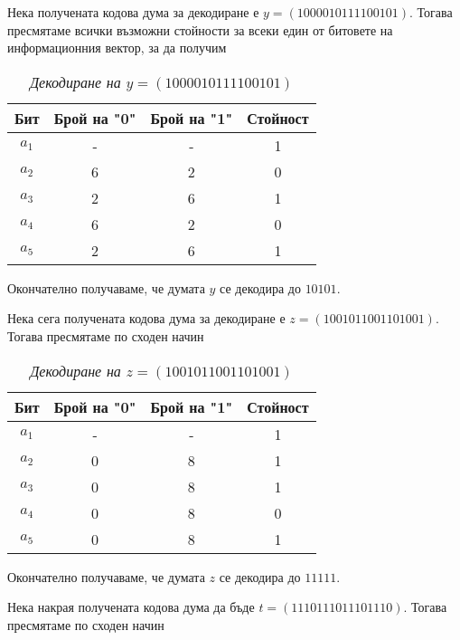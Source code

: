 \documentclass[11pt, oneside]{article}   	%
\begin{document}
Нека получената кодова дума за декодиране е $y = (1000 0101 1110 0101)$. Тогава пресмятаме всички възможни стойности за всеки един от битовете на информационния вектор, за да получим

\begin{table}[htbp]
    \centering
    \begin{tabular}{cccc}
        \toprule
            \textbf{Бит} & \textbf{Брой на "0"} & \textbf{Брой на "1"} & \textbf{Стойност} \\
        \midrule
            $ a_1 $ & - & - & 1 \\
            $ a_2 $ & 6 & 2 & 0 \\
            $ a_3 $ & 2 & 6 & 1 \\
            $ a_4 $ & 6 & 2 & 0 \\
            $ a_5 $ & 2 & 6 & 1 \\
        \bottomrule
    \end{tabular}
    \caption{\textit{Декодиране на $y = (1000 0101 1110 0101)$}}
\end{table}

Окончателно получаваме, че думата $y$ се декодира до $10101$.

Нека сега получената кодова дума за декодиране е $z = (1001 0110 0110 1001)$. Тогава пресмятаме по сходен начин

\begin{table}[htbp]
    \centering
    \begin{tabular}{cccc}
        \toprule
            \textbf{Бит} & \textbf{Брой на "0"} & \textbf{Брой на "1"} & \textbf{Стойност} \\
        \midrule
            $ a_1 $ & - & - & 1 \\
            $ a_2 $ & 0 & 8 & 1 \\
            $ a_3 $ & 0 & 8 & 1 \\
            $ a_4 $ & 0 & 8 & 0 \\
            $ a_5 $ & 0 & 8 & 1 \\
        \bottomrule
    \end{tabular}
    \caption{\textit{Декодиране на $z = (1001 0110 0110 1001)$}}
\end{table}

Окончателно получаваме, че думата $z$ се декодира до $11111$.

Нека накрая получената кодова дума да бъде $t = (1110 1110 1110 1110)$. Тогава пресмятаме по сходен начин
\end{document}
